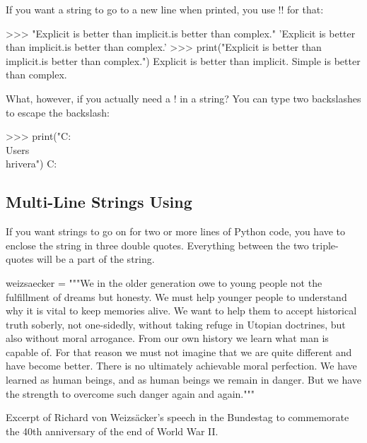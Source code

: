 \documentclass[11pt]{cselabheader}
\begin{document}
If you want a string to go to a new line when printed, you use \pythoninline!\n! for that:

\begin{pyconcode}
>>> "Explicit is better than implicit.\nSimple is better than complex."
'Explicit is better than implicit.\nSimple is better than complex.'
>>> print("Explicit is better than implicit.\nSimple is better than complex.")
Explicit is better than implicit.
Simple is better than complex.

\end{pyconcode}

What, however, if you actually need a \pythoninline!\! in a string?
You can type two backslashes to escape the backslash:

\begin{pyconcode}
>>> print("C:\\Users\\hrivera")
C:\Users\hrivera

\end{pyconcode}

\subsection{Multi-Line Strings Using }

If you want strings to go on for two or more lines of Python code, you
have to enclose the string in three double quotes. Everything between the two triple-quotes will be a part
of the string.

\begin{listing}[H]
  \vspace{-0.5em}
\begin{python3code}
weizsaecker = """We in the older generation owe to young people not the
fulfillment of dreams but honesty. We must help younger people to
understand why it is vital to keep memories alive. We want to help them
to accept historical truth soberly, not one-sidedly, without taking
refuge in Utopian doctrines, but also without moral arrogance. From our
own history we learn what man is capable of. For that reason we must not
imagine that we are quite different and have become better. There is no
ultimately achievable moral perfection. We have learned as human beings,
and as human beings we remain in danger. But we have the strength to
overcome such danger again and again."""
\end{python3code}
  \vspace{-1em}
  \caption{Excerpt of Richard von Weizs\"{a}cker's speech in
the Bundestag to commemorate the 40th anniversary of the end of World War II.}
  \vspace{-0.5em}
\end{listing}
\end{document}

